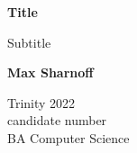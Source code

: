 \documentclass[12pt]{article}
\begin{document}

\begin{titlepage}
\begin{center}
    \Huge
    \textbf{Title}

    \vspace*{0.4cm}
    \LARGE
    Subtitle

    \vspace{1.5cm}
    \textbf{Max Sharnoff}

    Trinity 2022 \\
    candidate number \\
    BA Computer Science

\end{center}
\end{titlepage}

\newpage\ \addtocounter{page}{-1} \thispagestyle{empty}

\newpage


\newpage
\tableofcontents

\newpage


\newpage


\newpage


\newpage


\newpage
{}

\end{document}
